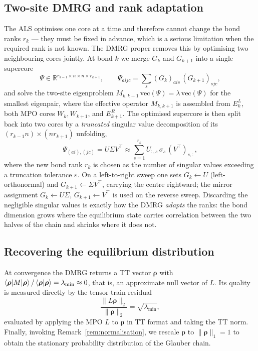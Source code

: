 \documentclass[12pt]{article}
\newcommand{\R}{\mathbb{R}}
\newcommand{\brho}{\boldsymbol{\rho}}
\theoremstyle{definition}
\theoremstyle{remark}
\begin{document}
\subsection{Two-site DMRG and rank adaptation}\label{sec:two-site}

The ALS optimises one core at a time and therefore cannot change the bond ranks $r_k$ --- they must be fixed in advance, which is a serious limitation when the required rank is not known. The DMRG proper removes this by optimising two neighbouring cores jointly. At bond $k$ we merge $G_k$ and $G_{k+1}$ into a single supercore
\[
\Psi \in \R^{r_{k-1} \times n \times n \times r_{k+1}},
\qquad
\Psi_{aijc} = \sum_{s} (G_k)_{ais}\, (G_{k+1})_{sjc},
\]
and solve the two-site eigenproblem $M_{k,k+1}\, \mathrm{vec}(\Psi) = \lambda\, \mathrm{vec}(\Psi)$ for the smallest eigenpair, where the effective operator $M_{k,k+1}$ is assembled from $E^L_k$, both MPO cores $W_k, W_{k+1}$, and $E^R_{k+1}$. The optimised supercore is then split back into two cores by a \emph{truncated} singular value decomposition of its $(r_{k-1} n) \times (n r_{k+1})$ unfolding,
\[
\Psi_{(ai),(jc)} = U \Sigma V^\top
\approx \sum_{s=1}^{r_k} U_{:,s}\, \sigma_s\, (V^\top)_{s,:},
\]
where the new bond rank $r_k$ is chosen as the number of singular values exceeding a truncation tolerance $\varepsilon$. On a left-to-right sweep one sets $G_k \leftarrow U$ (left-orthonormal) and $G_{k+1} \leftarrow \Sigma V^\top$, carrying the centre rightward; the mirror assignment $G_k \leftarrow U\Sigma$, $G_{k+1} \leftarrow V^\top$ is used on the reverse sweep. Discarding the negligible singular values is exactly how the DMRG \emph{adapts} the ranks: the bond dimension grows where the equilibrium state carries correlation between the two halves of the chain and shrinks where it does not.

\subsection{Recovering the equilibrium distribution}\label{sec:recovery}

At convergence the DMRG returns a TT vector $\brho$ with $\braket{\brho|M|\brho}/\braket{\brho|\brho} = \lambda_{\min} \approx 0$, that is, an approximate null vector of $L$. Its quality is measured directly by the tensor-train residual
\[
\frac{\|L\brho\|_2}{\|\brho\|_2} = \sqrt{\lambda_{\min}},
\]
evaluated by applying the MPO $L$ to $\brho$ in TT format and taking the TT norm. Finally, invoking Remark~\ref{rem:normalisation}, we rescale $\brho$ to $\|\brho\|_1 = 1$ to obtain the stationary probability distribution of the Glauber chain.
\end{document}
